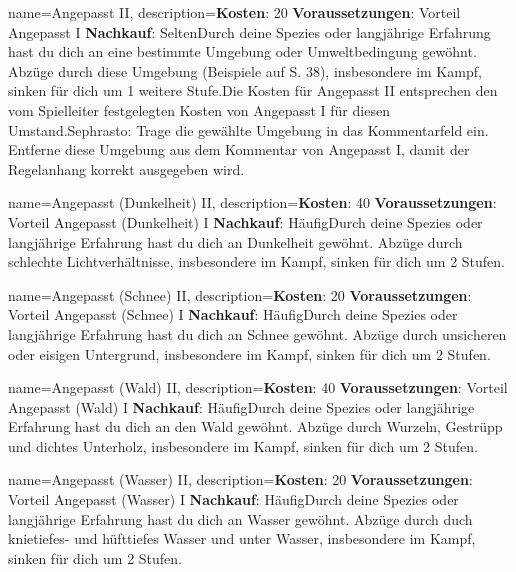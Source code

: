 {
    name={Angepasst II},
    description={\textbf{Kosten}: 20 \textbf{Voraussetzungen}: Vorteil Angepasst I \textbf{Nachkauf}: Selten\newline Durch deine Spezies oder langjährige Erfahrung hast du dich an eine bestimmte Umgebung oder Umweltbedingung gewöhnt. Abzüge durch diese Umgebung (Beispiele auf S. 38), insbesondere im Kampf, sinken für dich um 1 weitere Stufe.\newline Die Kosten für Angepasst II entsprechen den vom Spielleiter festgelegten Kosten von Angepasst I für diesen Umstand.\newline Sephrasto: Trage die gewählte Umgebung in das Kommentarfeld ein. Entferne diese Umgebung aus dem Kommentar von Angepasst I, damit der Regelanhang korrekt ausgegeben wird.}
}


{
    name={Angepasst (Dunkelheit) II},
    description={\textbf{Kosten}: 40 \textbf{Voraussetzungen}: Vorteil Angepasst (Dunkelheit) I \textbf{Nachkauf}: Häufig\newline Durch deine Spezies oder langjährige Erfahrung hast du dich an Dunkelheit gewöhnt. Abzüge durch schlechte Lichtverhältnisse, insbesondere im Kampf, sinken für dich um 2 Stufen.}
}


{
    name={Angepasst (Schnee) II},
    description={\textbf{Kosten}: 20 \textbf{Voraussetzungen}: Vorteil Angepasst (Schnee) I \textbf{Nachkauf}: Häufig\newline Durch deine Spezies oder langjährige Erfahrung hast du dich an Schnee gewöhnt. Abzüge durch unsicheren oder eisigen Untergrund, insbesondere im Kampf, sinken für dich um 2 Stufen.}
}


{
    name={Angepasst (Wald) II},
    description={\textbf{Kosten}: 40 \textbf{Voraussetzungen}: Vorteil Angepasst (Wald) I \textbf{Nachkauf}: Häufig\newline Durch deine Spezies oder langjährige Erfahrung hast du dich an den Wald gewöhnt. Abzüge durch Wurzeln, Gestrüpp und dichtes Unterholz, insbesondere im Kampf, sinken für dich um 2 Stufen.}
}


{
    name={Angepasst (Wasser) II},
    description={\textbf{Kosten}: 20 \textbf{Voraussetzungen}: Vorteil Angepasst (Wasser) I \textbf{Nachkauf}: Häufig\newline Durch deine Spezies oder langjährige Erfahrung hast du dich an Wasser gewöhnt. Abzüge durch duch knietiefes- und hüfttiefes Wasser und unter Wasser, insbesondere im Kampf, sinken für dich um 2 Stufen.}
}


